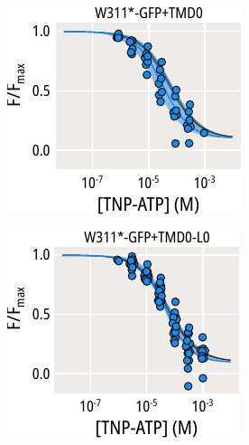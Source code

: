 \begin{figure}[hbtp]
	\centering
	\begin{subfigure}[t]{0.45\textwidth}
		\caption{}\label{ch6fig:tmd0s_unroofed_1}
		\centering
		\includegraphics[width=\textwidth]{tmd0s_unroofed_1.pdf}
	\end{subfigure}
	\hfill
	\begin{subfigure}[t]{0.45\textwidth}
		\caption{}\label{ch6fig:tmd0s_unroofed_2}
		\centering
		\includegraphics[width=\textwidth]{tmd0s_unroofed_2.pdf}

\end{subfigure}
\end{figure}
